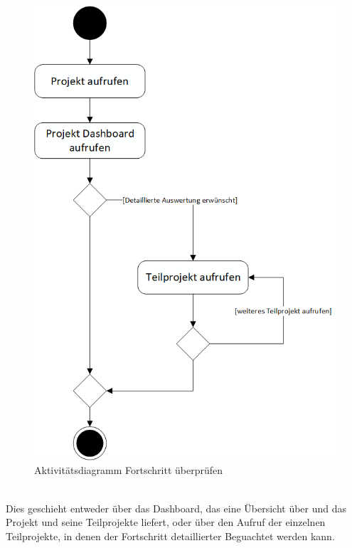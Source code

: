 \begin{figure}[h!]
    \centering
    \includegraphics[scale=0.67]{./Bilder/AD6_FortschrittÜberprüfen.png}
    \caption[Aktivitätsdiagramm Anwendungsfall 6]{Aktivitätsdiagramm Fortschritt überprüfen}
    \label{fig:AD6}
\end{figure}
\\Dies geschieht entweder über das Dashboard, das eine Übersicht über und das Projekt und seine Teilprojekte liefert, oder über den Aufruf der einzelnen Teilprojekte, in denen der Fortschritt detaillierter Beguachtet werden kann.
\newpage
